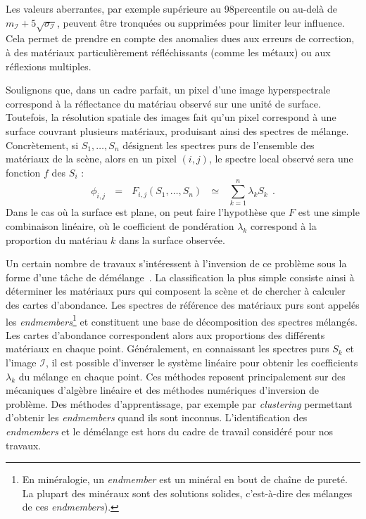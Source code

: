 Les valeurs aberrantes, par exemple supérieure au 98\ieme percentile ou au-delà de $m_\mathcal{I} + 5\sqrt{\sigma_\mathcal{I}}$, peuvent être tronquées ou supprimées pour limiter leur influence. Cela permet de prendre en compte des anomalies dues aux erreurs de correction, à des matériaux particulièrement réfléchissants (comme les métaux) ou aux réflexions multiples.

Soulignons que, dans un cadre parfait, un pixel d'une image hyperspectrale correspond à la réflectance du matériau observé sur une unité de surface. Toutefois, la résolution spatiale des images fait qu'un pixel correspond à une surface couvrant plusieurs matériaux, produisant ainsi des spectres de mélange. Concrètement, si $S_1, \dots, S_n$ désignent les spectres purs de l'ensemble des matériaux de la scène, alors en un pixel $(i,j)$, le spectre local observé sera une fonction $f$ des $S_i$ :
\begin{equation}
  \phi_{i,j}~~~=~~~F_{i,j}(S_1, \dots, S_n)~~~\simeq~~~\sum_{k = 1}^n \lambda_k S_k~~.
\end{equation}
Dans le cas où la surface est plane, on peut faire l'hypothèse que $F$ est une simple combinaison linéaire, où le coefficient de pondération $\lambda_k$ correspond à la proportion du matériau $k$ dans la surface observée.

Un certain nombre de travaux s'intéressent à l'inversion de ce problème sous la forme d'une tâche de démélange~\cite{parra_unmixing_1999}. La classification la plus simple consiste ainsi à déterminer les matériaux purs qui composent la scène et de chercher à calculer des cartes d'abondance. Les spectres de référence des matériaux purs sont appelés les \emph{endmembers}\footnote{En minéralogie, un \emph{endmember} est un minéral en bout de chaîne de pureté. La plupart des minéraux sont des solutions solides, c'est-à-dire des mélanges de ces \emph{endmembers}).} et constituent une base de décomposition des spectres mélangés. Les cartes d'abondance correspondent alors aux proportions des différents matériaux en chaque point. Généralement, en connaissant les spectres purs $S_k$ et l'image $\mathcal{I}$, il est possible d'inverser le système linéaire pour obtenir les coefficients $\lambda_k$ du mélange en chaque point. Ces méthodes reposent principalement sur des mécaniques d'algèbre linéaire et des méthodes numériques d'inversion de problème. Des méthodes d'apprentissage, par exemple par \emph{clustering} permettant d'obtenir les \emph{endmembers} quand ils sont inconnus. L'identification des \emph{endmembers} et le démélange est hors du cadre de travail considéré pour nos travaux.


